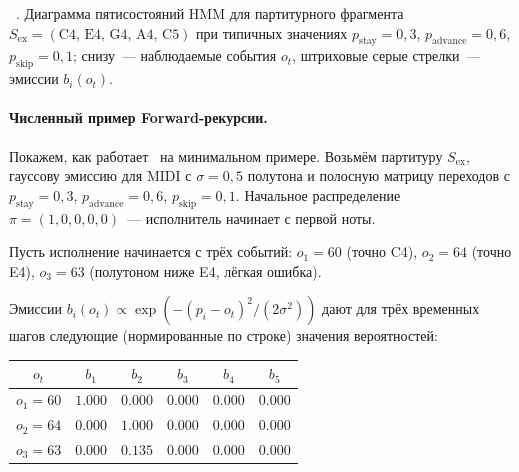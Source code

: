 \par\addvspace{2pt}
{\centering
{}%
\resizebox{\columnwidth}{!}{}\par
\vspace{2pt}
\footnotesize
\figurename~\thefigure. Диаграмма пятисостояний HMM для
партитурного фрагмента $S_{\text{ex}}=(\text{C4, E4, G4, A4,
C5})$ при типичных значениях $p_{\text{stay}}=0{,}3$,
$p_{\text{advance}}=0{,}6$, $p_{\text{skip}}=0{,}1$; снизу~---
наблюдаемые события $o_t$, штриховые серые стрелки~---
эмиссии $b_i(o_t)$.\par}
\addvspace{4pt}

\paragraph*{Численный пример Forward-рекурсии.} Покажем, как
работает~ на минимальном примере. Возьмём
партитуру $S_{\text{ex}}$, гауссову эмиссию для MIDI с
$\sigma=0{,}5$ полутона и полосную матрицу переходов с
$p_{\text{stay}}=0{,}3$, $p_{\text{advance}}=0{,}6$,
$p_{\text{skip}}=0{,}1$. Начальное распределение
$\pi=(1,0,0,0,0)$~--- исполнитель начинает с первой ноты.

Пусть исполнение начинается с трёх событий:
$o_1=60$ (точно C4),
$o_2=64$ (точно E4),
$o_3=63$ (полутоном ниже E4, лёгкая ошибка).

Эмиссии $b_i(o_t)\propto \exp(-(p_i-o_t)^2/(2\sigma^2))$ дают
для трёх временных шагов следующие (нормированные по строке)
значения вероятностей:

\par\addvspace{2pt}
{\centering
\footnotesize
\begin{tabular}{c|ccccc}
\toprule
$o_t$ & $b_1$ & $b_2$ & $b_3$ & $b_4$ & $b_5$ \\
\midrule
$o_1=60$ & $1.000$ & $0.000$ & $0.000$ & $0.000$ & $0.000$ \\
$o_2=64$ & $0.000$ & $1.000$ & $0.000$ & $0.000$ & $0.000$ \\
$o_3=63$ & $0.000$ & $0.135$ & $0.000$ & $0.000$ & $0.000$ \\
\bottomrule
\end{tabular}\par
\vspace{2pt}}
\addvspace{4pt}

